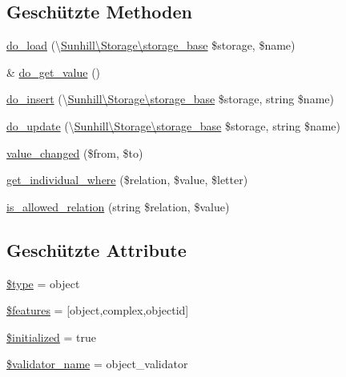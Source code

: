 \subsection*{Geschützte Methoden}
\begin{DoxyCompactItemize}
\item 
\hyperlink{classSunhill_1_1Properties_1_1oo__property__object_ad4dbb31bde0369ae5f104cc3562754b2}{do\+\_\+load} (\textbackslash{}\hyperlink{classSunhill_1_1Storage_1_1storage__base}{Sunhill\textbackslash{}\+Storage\textbackslash{}storage\+\_\+base} \$storage, \$name)
\item 
\& \hyperlink{classSunhill_1_1Properties_1_1oo__property__object_a8ea8708197f2460537589bf45a02da3c}{do\+\_\+get\+\_\+value} ()
\item 
\hyperlink{classSunhill_1_1Properties_1_1oo__property__object_ac97b532d8c0652030b7a2fef0cf28b01}{do\+\_\+insert} (\textbackslash{}\hyperlink{classSunhill_1_1Storage_1_1storage__base}{Sunhill\textbackslash{}\+Storage\textbackslash{}storage\+\_\+base} \$storage, string \$name)
\item 
\hyperlink{classSunhill_1_1Properties_1_1oo__property__object_a1e2fa995f103ab82945814811c661013}{do\+\_\+update} (\textbackslash{}\hyperlink{classSunhill_1_1Storage_1_1storage__base}{Sunhill\textbackslash{}\+Storage\textbackslash{}storage\+\_\+base} \$storage, string \$name)
\item 
\hyperlink{classSunhill_1_1Properties_1_1oo__property__object_ade7ab7cf460bc707a78fe679b7daf567}{value\+\_\+changed} (\$from, \$to)
\item 
\hyperlink{classSunhill_1_1Properties_1_1oo__property__object_ad3a0fa9dde82dd0421168a12c38dd253}{get\+\_\+individual\+\_\+where} (\$relation, \$value, \$letter)
\item 
\hyperlink{classSunhill_1_1Properties_1_1oo__property__object_a9f71461767308b65d0d34d3658345cf5}{is\+\_\+allowed\+\_\+relation} (string \$relation, \$value)
\end{DoxyCompactItemize}
\subsection*{Geschützte Attribute}
\begin{DoxyCompactItemize}
\item 
\hyperlink{classSunhill_1_1Properties_1_1oo__property__object_af114e52d6952350a2125154043a3dbaa}{\$type} = \textquotesingle{}object\textquotesingle{}
\item 
\hyperlink{classSunhill_1_1Properties_1_1oo__property__object_a9dc94c0bb22c4baebaf4706fccf03029}{\$features} = \mbox{[}\textquotesingle{}object\textquotesingle{},\textquotesingle{}complex\textquotesingle{},\textquotesingle{}objectid\textquotesingle{}\mbox{]}
\item 
\hyperlink{classSunhill_1_1Properties_1_1oo__property__object_a358e4e6f9019b2d92b46c74850b13294}{\$initialized} = true
\item 
\hyperlink{classSunhill_1_1Properties_1_1oo__property__object_ac2fc409f9bd8a0aef8399fd17869dd12}{\$validator\+\_\+name} = \textquotesingle{}object\+\_\+validator\textquotesingle{}
\end{DoxyCompactItemize}


